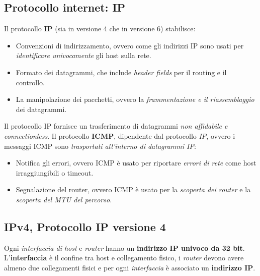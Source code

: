 \subsection{Protocollo internet: IP}
Il protocollo \textbf{IP} (sia in versione 4 che in versione 6) stabilisce:
\begin{itemize}
  \item Convenzioni di indirizzamento, ovvero come gli indirizzi IP sono usati per \textit{identificare univocamente} gli host sulla rete.
  \item Formato dei datagrammi, che include \textit{header fields} per il routing e il controllo.
  \item La manipolazione dei pacchetti, ovvero la \textit{frammentazione e il riassemblaggio} dei datagrammi.
\end{itemize}
Il protocollo IP fornisce un trasferimento di datagrammi \textit{non affidabile e connectionless}.
Il protocollo \textbf{ICMP}, dipendente dal protocollo \textit{IP}, ovvero i messaggi ICMP sono \textit{trasportati all'interno di datagrammi IP}:
\begin{itemize}
  \item Notifica gli errori, ovvero ICMP è usato per riportare \textit{errori di rete} come host irraggiungibili o timeout.
  \item Segnalazione del router, ovvero ICMP è usato per la \textit{scoperta dei router} e la \textit{scoperta del MTU del percorso}.
\end{itemize}

\subsection{IPv4, Protocollo IP versione 4}
Ogni \textit{interfaccia di host} e \textit{router} hanno un \textbf{indirizzo IP univoco da 32 bit}. 
L'\textbf{interfaccia} è il confine tra host e collegamento fisico, i \textit{router} devono avere almeno due collegamenti fisici  e per ogni \textit{interfaccia} è associato un \textbf{indirizzo IP}. 

